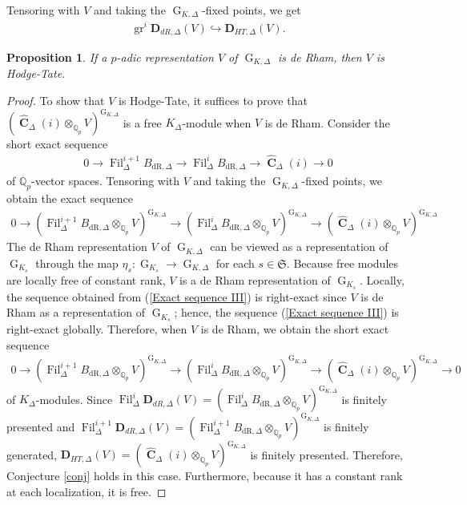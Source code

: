 \documentclass{amsart}
\newtheorem{proposition}{Proposition}[section]
\DeclareMathOperator{\C}{\textbf{C}}
\DeclareMathOperator{\gr}{gr}
\newcommand{\mBdr}{B_{\mathrm{dR},\Delta}}
\newcommand{\mbDHT}{\textbf{D}_{HT,\Delta}}
\newcommand{\mbDdR}{\textbf{D}_{dR,\Delta}}
\DeclareMathOperator{\G}{G}
\DeclareMathOperator{\Fil}{Fil}
\begin{document}
Tensoring with $V$ and taking the $\G_{K,\Delta}$-fixed points, we get 
\begin{align*}
    \gr^i\mbDdR(V)\hookrightarrow\mbDHT(V).
\end{align*}

\begin{proposition}
    If a $p$-adic representation $V$ of $\G_{K,\Delta}$ is de Rham, then $V$ is Hodge-Tate. 
\end{proposition}

\begin{proof}
    To show that $V$ is Hodge-Tate, it suffices to prove that $(\widehat{\C}_\Delta(i)\otimes_{\mathbb{Q}_p} V)^{\G_{K,\Delta}}$ is a free $K_\Delta$-module when $V$ is de Rham. Consider the short exact sequence
    \begin{align*}
        0\to \Fil^{i+1}_\Delta\mBdr\to\Fil^i_\Delta\mBdr\to \widehat{\C}_\Delta(i)\to 0 
    \end{align*}
    of $\mathbb{Q}_p$-vector spaces. Tensoring with $V$ and taking the $\G_{K,\Delta}$-fixed points, we obtain the exact sequence
    \begin{align}\label{Exact sequence III}
        0\to (\Fil^{i+1}_\Delta\mBdr\otimes_{\mathbb{Q}_p}  V)^{\G_{K,\Delta}}\to (\Fil^i_\Delta\mBdr\otimes_{\mathbb{Q}_p} V)^{\G_{K,\Delta}}\to (\widehat{\C}_\Delta(i)\otimes_{\mathbb{Q}_p} V)^{\G_{K,\Delta}}
    \end{align}
    The de Rham representation $V$ of $\G_{K,\Delta}$ can be viewed as a representation of $\G_{K_s}$ through the map $\eta_s:\G_{K_s}\to\G_{K,\Delta}$ for each $s\in\mathfrak{S}$. Because free modules are locally free of constant rank, $V$ is a de Rham representation of $\G_{K_s}$. Locally, the sequence obtained from (\ref{Exact sequence III}) is right-exact since $V$ is de Rham as a representation of $\G_{K_s}$; hence, the sequence (\ref{Exact sequence III}) is right-exact globally. Therefore, when $V$ is de Rham, we obtain the short exact sequence
    \begin{align*}
         0\to (\Fil^{i+1}_\Delta\mBdr\otimes_{\mathbb{Q}_p}  V)^{\G_{K,\Delta}}\to (\Fil^i_\Delta\mBdr\otimes_{\mathbb{Q}_p} V)^{\G_{K,\Delta}}\to (\widehat{\C}_\Delta(i)\otimes_{\mathbb{Q}_p} V)^{\G_{K,\Delta}}\to 0
    \end{align*}
    of $K_\Delta$-modules. Since $\Fil^i_\Delta\mbDdR(V)=(\Fil^i_\Delta\mBdr\otimes_{\mathbb{Q}_p}V)^{\G_{K,\Delta}}$ is finitely presented and $\Fil^{i+1}_\Delta\mbDdR(V)=(\Fil^{i+1}_\Delta\mBdr\otimes_{\mathbb{Q}_p}V)^{\G_{K,\Delta}}$ is finitely generated, $\mbDHT(V)=(\widehat{\C}_\Delta(i)\otimes_{\mathbb{Q}_p}V)^{\G_{K,\Delta}}$ is finitely presented. Therefore, Conjecture \ref{conj} holds in this case. Furthermore, because it has a constant rank at each localization, it is free. 
\end{proof}
\end{document}
